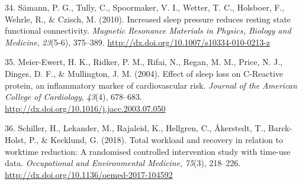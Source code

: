 \documentclass[
  english,
  man,draftall]{apa6}
\newlength{\cslhangindent}
\newenvironment{cslreferences}%
  {\setlength{\parindent}{0pt}%
  \everypar{\setlength{\hangindent}{\cslhangindent}}\ignorespaces}%
  {\par}
\begin{document}
\begin{cslreferences}
\leavevmode\hypertarget{ref-Samann2010}{}%
34. Sämann, P. G., Tully, C., Spoormaker, V. I., Wetter, T. C., Holsboer, F., Wehrle, R., \& Czisch, M. (2010). Increased sleep pressure reduces resting state functional connectivity. \emph{Magnetic Resonance Materials in Physics, Biology and Medicine}, \emph{23}(5-6), 375--389. \url{http://dx.doi.org/10.1007/s10334-010-0213-z}

\leavevmode\hypertarget{ref-Meier-Ewert2004}{}%
35. Meier-Ewert, H. K., Ridker, P. M., Rifai, N., Regan, M. M., Price, N. J., Dinges, D. F., \& Mullington, J. M. (2004). Effect of sleep loss on C-Reactive protein, an inflammatory marker of cardiovascular risk. \emph{Journal of the American College of Cardiology}, \emph{43}(4), 678--683. \url{http://dx.doi.org/10.1016/j.jacc.2003.07.050}

\leavevmode\hypertarget{ref-Schiller2018}{}%
36. Schiller, H., Lekander, M., Rajaleid, K., Hellgren, C., Åkerstedt, T., Barck-Holst, P., \& Kecklund, G. (2018). Total workload and recovery in relation to worktime reduction: A randomised controlled intervention study with time-use data. \emph{Occupational and Environmental Medicine}, \emph{75}(3), 218--226. \url{http://dx.doi.org/10.1136/oemed-2017-104592}
\end{cslreferences}
\end{document}
